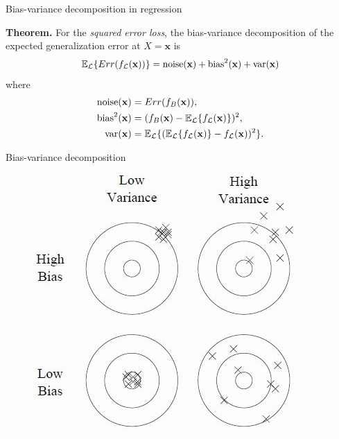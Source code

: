 \documentclass{beamer}
\begin{document}
\begin{frame}{Bias-variance decomposition in regression}

{\bf Theorem.} For the {\it squared error loss}, the bias-variance decomposition of the expected
generalization error at $X=\mathbf{x}$ is
\begin{equation*}
\mathbb{E}_{\cal L} \{ Err(f_{\cal L}(\mathbf{x})) \} = \text{noise}(\mathbf{x}) + \text{bias}^2(\mathbf{x}) + \text{var}(\mathbf{x})
\end{equation*}
where
\begin{align*}
\text{noise}(\mathbf{x}) &= Err(f_B(\mathbf{x})), \\
\text{bias}^2(\mathbf{x}) &= (f_B(\mathbf{x}) - \mathbb{E}_{\cal L} \{ f_{\cal L}(\mathbf{x}) \} )^2, \\
\text{var}(\mathbf{x}) &= \mathbb{E}_{\cal L} \{ (\mathbb{E}_{\cal L} \{ f_{\cal L}(\mathbf{x}) \} - f_{\cal L}(\mathbf{x}))^2 \}.
\end{align*}

\end{frame}

\begin{frame}{Bias-variance decomposition}
\begin{figure}
\includegraphics[scale=0.7]{./figures/bias-variance-darts.jpg}
\end{figure}
\end{frame}
\end{document}
